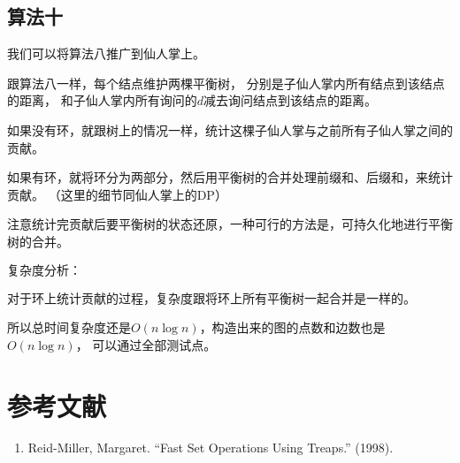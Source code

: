 \documentclass{noiassignment}
\begin{document}
\subsection{算法十}

我们可以将算法八推广到仙人掌上。

跟算法八一样，每个结点维护两棵平衡树，
分别是子仙人掌内所有结点到该结点的距离，
和子仙人掌内所有询问的$d$减去询问结点到该结点的距离。

如果没有环，就跟树上的情况一样，统计这棵子仙人掌与之前所有子仙人掌之间的贡献。

如果有环，就将环分为两部分，然后用平衡树的合并处理前缀和、后缀和，来统计贡献。
（这里的细节同仙人掌上的DP）

注意统计完贡献后要平衡树的状态还原，一种可行的方法是，可持久化地进行平衡树的合并。

$\textbf{复杂度分析：}$

对于环上统计贡献的过程，复杂度跟将环上所有平衡树一起合并是一样的。

所以总时间复杂度还是$O(n \log n)$，构造出来的图的点数和边数也是$O(n \log n)$，
可以通过全部测试点。




\section*{参考文献}
\begin{enumerate}[\lbrack 1\rbrack]
\item \label{treap} Reid-Miller, Margaret. ``Fast Set Operations Using Treaps.'' (1998).
\end{enumerate}













\end{document}
